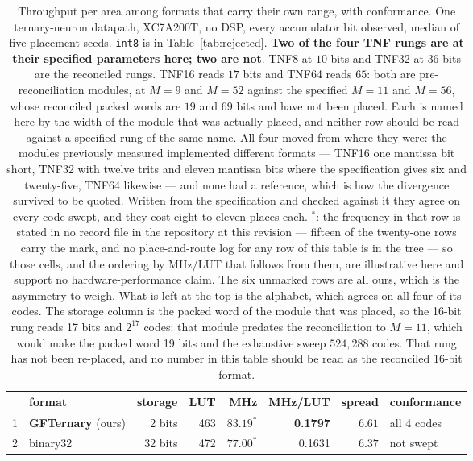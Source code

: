 \documentclass[11pt]{article}
\theoremstyle{definition}
\begin{document}
\begin{table}[t]\centering
\caption{Throughput per area among formats that carry their own range, with
conformance. One ternary-neuron datapath, XC7A200T, no DSP, every accumulator
bit observed, median of five placement seeds. \texttt{int8} is in
Table~\ref{tab:rejected}. \textbf{Two of the four TNF rungs are at their
specified parameters here; two are not}. TNF8 at $10$ bits and TNF32 at $36$
bits are the reconciled rungs. TNF16 reads $17$ bits and TNF64 reads $65$: both
are pre-reconciliation modules, at $M{=}9$ and $M{=}52$ against the specified
$M{=}11$ and $M{=}56$, whose reconciled packed words are $19$ and $69$ bits and
have not been placed. Each is named here by the width of the module that was
actually placed, and neither row should be read against a specified rung of the
same name. All four moved from where they were: the modules
previously measured
implemented different formats --- TNF16 one mantissa bit short, TNF32 with twelve
trits and eleven mantissa bits where the specification gives six and
twenty-five, TNF64 likewise --- and none had a reference, which is how the
divergence survived to be quoted. Written from the specification and checked
against it they agree on every code swept, and they cost eight to eleven places
each. $^{\ast}$: the frequency in that row is stated in no record file in the
repository at this revision --- fifteen of the twenty-one rows carry the mark, and
no place-and-route log for any row of this table is in the tree --- so those cells,
and the ordering by MHz/LUT that follows from them, are illustrative here and
support no hardware-performance claim. The six unmarked rows are all ours, which
is the asymmetry to weigh. What is left at the top is the alphabet, which agrees on all four of its
codes. The storage column is the packed word of the module that was placed, so the
16-bit rung reads 17 bits and $2^{17}$ codes: that module predates the
reconciliation to $M = 11$, which would make the packed word 19 bits and the
exhaustive sweep $524{,}288$ codes. That rung has not been re-placed, and no
number in this table should be read as the reconciled 16-bit format.}
\label{tab:fullthroughput}
\small\setlength{\tabcolsep}{4pt}
\begin{tabular}{rlrrrrrl}
\toprule
& format & storage & LUT & MHz & MHz/LUT & spread & conformance \\
\midrule
1 & \textbf{GFTernary} (ours) & 2 bits & 463 & $83.19^{\ast}$ & \textbf{0.1797} & $6.61$ & all 4 codes \\
2 & binary32 & 32 bits & 472 & $77.00^{\ast}$ & 0.1631 & $6.37$ & not swept \\

\end{tabular}
\end{table}
\end{document}
